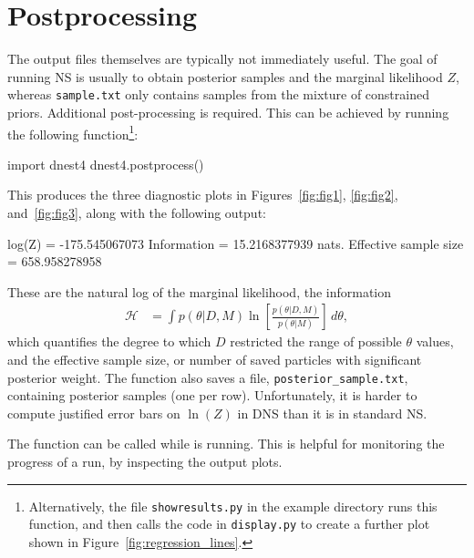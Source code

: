 \documentclass[article, nojss]{jss}
\begin{document}
\section{Postprocessing}\label{sec:postprocessing}
The output files themselves are typically not immediately useful.
The goal of running
NS is usually to obtain posterior samples and the marginal likelihood $Z$,
whereas {\tt sample.txt} only contains samples from the mixture of constrained
priors. Additional
post-processing is required. This can be achieved by running the following
 function\footnote{Alternatively, the file
{\tt showresults.py} in the example directory runs this function, and then
calls the code in {\tt display.py} to create a further plot shown in
Figure~\ref{fig:regression_lines}.}:

\begin{CodeChunk}
\begin{CodeInput}
import dnest4
dnest4.postprocess()
\end{CodeInput}
\end{CodeChunk}
This produces the three diagnostic plots in Figures~\ref{fig:fig1},
\ref{fig:fig2}, and~\ref{fig:fig3}, along with the following output:
\begin{CodeChunk}
\begin{CodeOutput}
log(Z) = -175.545067073
Information = 15.2168377939 nats.
Effective sample size = 658.958278958
\end{CodeOutput}
\end{CodeChunk}
These are the natural log of the marginal likelihood, the
information
\begin{align}
\mathcal{H} &= \int p(\theta|D, M)
\ln\left[\frac{p(\theta | D, M)}{p(\theta | M)}\right] \, d\theta,
\end{align}
which quantifies the degree to which $D$ restricted the
range of possible $\theta$ values,
and the effective sample size,
or number of saved particles with significant posterior weight.
The  function also saves a file,
{\tt posterior\_sample.txt}, containing posterior samples (one per row).
Unfortunately, it is harder to compute justified error bars on $\ln(Z)$
in DNS than it is in standard NS.

The  function can be called while  is running.
This is helpful for monitoring the progress of a run, by inspecting the
output plots.
\end{document}
